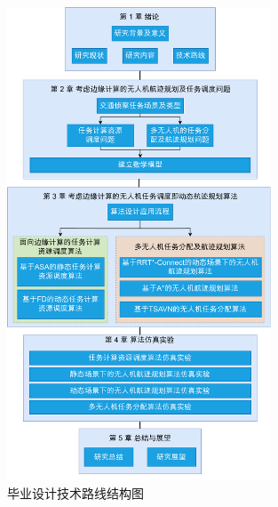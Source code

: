 \begin{figure}[!htbp]
    \centering
    \includegraphics[width=0.7\textwidth]{./images/毕业设计技术路线结构图.drawio.pdf}
    \caption{毕业设计技术路线结构图}
    \label{fig:毕业设计技术路线结构图}
\end{figure}

\newpage
